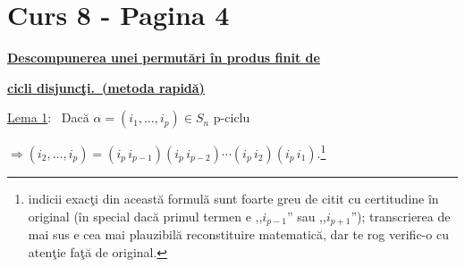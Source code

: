 \section*{Curs 8 - Pagina 4}

\noindent\underline{\textbf{Descompunerea unei permutări în produs finit de}}

\noindent\underline{\textbf{cicli disjuncţi.\ (metoda rapidă)}}

\bigskip
\bigskip
\noindent\underline{Lema 1}: \ Dacă $\alpha = (i_1,\ldots,i_p)\in S_n$ \quad p-ciclu

\bigskip
\noindent $\Rightarrow (i_2,\ldots,i_p) = (i_p\,i_{p-1})(i_p\,i_{p-2})\cdots(i_p\,i_2)(i_p\,i_1).$\footnote{indicii exacţi din această formulă sunt foarte greu de citit cu certitudine în original (în special dacă primul termen e ,,$i_{p-1}$'' sau ,,$i_{p+1}$''); transcrierea de mai sus e cea mai plauzibilă reconstituire matematică, dar te rog verific-o cu atenţie faţă de original.}
